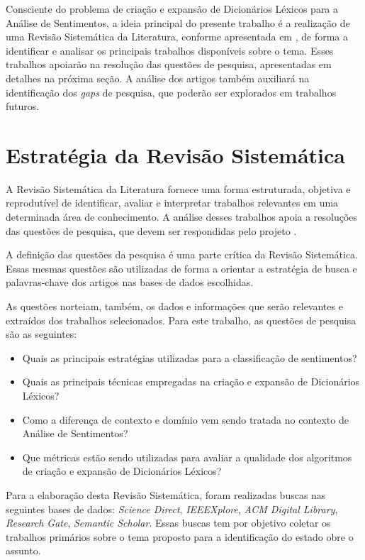 \documentclass[12pt]{article}
\begin{document}
Consciente do problema de criação e expansão de Dicionários Léxicos para a Análise de Sentimentos, a ideia principal do presente trabalho é a realização de uma Revisão Sistemática da Literatura, conforme apresentada em \cite{Kitchenham2004}, de forma a identificar e analisar os principais trabalhos disponíveis sobre o tema. Esses trabalhos apoiarão na resolução das questões de pesquisa, apresentadas em detalhes na próxima seção. A análise dos artigos também auxiliará na identificação dos \emph{gaps} de pesquisa, que poderão ser explorados em trabalhos futuros.

\section{Estratégia da Revisão Sistemática}
A Revisão Sistemática da Literatura fornece uma forma estruturada, objetiva e reprodutível de identificar, avaliar e interpretar trabalhos relevantes em uma determinada área de conhecimento. A análise desses trabalhos apoia a resoluções das questões de pesquisa, que devem ser respondidas pelo projeto \cite{Kitchenham2004}.

A definição das questões da pesquisa é uma parte crítica da Revisão Sistemática. Essas mesmas questões são utilizadas de forma a orientar a estratégia de busca e palavras-chave dos artigos nas bases de dados escolhidas.

As questões norteiam, também, os dados e informações que serão relevantes e extraídos dos trabalhos selecionados. Para este trabalho, as questões de pesquisa são as seguintes:

\label{sec:questoesPesquisa}
\begin{itemize}
	\item{Quais as principais estratégias utilizadas para a classificação de sentimentos?}
	\item{Quais as principais técnicas empregadas na criação e expansão de Dicionários Léxicos?}
	\item{Como a diferença de contexto e domínio vem sendo tratada no contexto de Análise de Sentimentos?}
	\item{Que métricas estão sendo utilizadas para avaliar a qualidade dos algoritmos de criação e expansão de Dicionários Léxicos?}
\end{itemize}

Para a elaboração desta Revisão Sistemática, foram realizadas buscas nas seguintes bases de dados: \emph{Science Direct}, \emph{IEEEXplore}, \emph{ACM Digital Library}, \emph{Research Gate}, \emph{Semantic Scholar}. Essas buscas tem por objetivo coletar os trabalhos primários sobre o tema proposto para a identificação do estado obre o assunto. 
\end{document}
